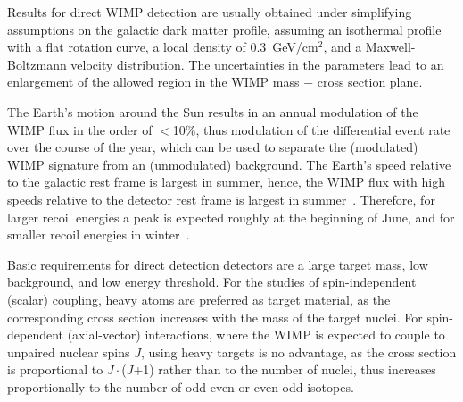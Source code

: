 Results for direct WIMP detection are usually obtained under simplifying assumptions on the galactic dark matter profile, assuming an isothermal profile with a flat rotation curve, a local density of 0.3~GeV/cm$^{2}$, and a Maxwell-Boltzmann velocity distribution. The uncertainties in the parameters lead to an enlargement of the allowed region in the WIMP mass $-$ cross section plane.

The Earth's motion around the Sun results in an annual modulation of the WIMP flux in the order of $<$10\%, thus modulation of the differential event rate over the course of the year, which can be used to separate the (modulated) WIMP signature from an (unmodulated) background. The Earth's speed relative to the galactic rest frame is largest in summer, hence, the WIMP flux with high speeds relative to the detector rest frame is largest in summer~\cite{EarthVelocitySpergel}. Therefore, for larger recoil energies a peak is expected roughly at the beginning of June, and for smaller recoil energies in winter~\cite{ModulationSignal}.


Basic requirements for direct detection detectors are a large target mass, low background, and low energy threshold. For the studies of spin-independent (scalar) coupling, heavy atoms are preferred as target material, as the corresponding cross section increases with the mass of the target nuclei. For spin-dependent (axial-vector) interactions, where the WIMP is expected to couple to unpaired nuclear spins $J$, using heavy targets is no advantage, as the cross section is proportional to $J\cdot$($J$+1) rather than to the number of nuclei, thus increases proportionally to the number of odd-even or even-odd isotopes. 

